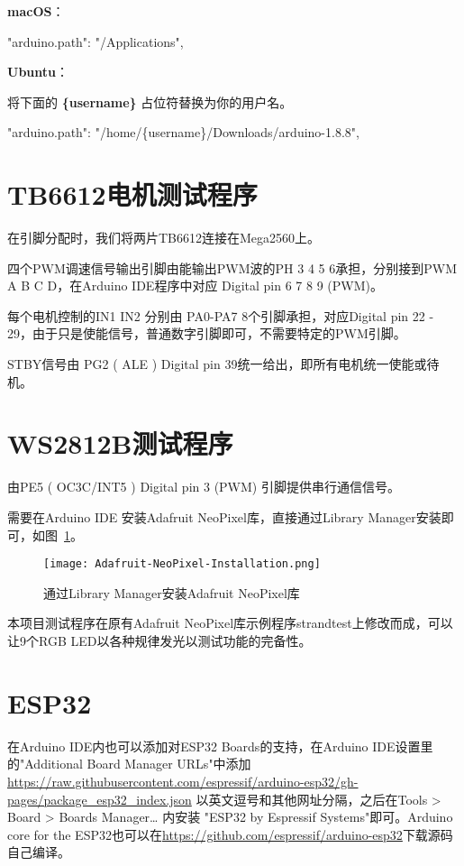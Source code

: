 \begin{enumerate}
        \textbf{macOS}：
    
        \begin{tcolorbox}    
            "arduino.path": "/Applications",
        \end{tcolorbox}

        \textbf{Ubuntu}：
    
        将下面的 \textbf{\{username\}} 占位符替换为你的用户名。
        \begin{tcolorbox}
            "arduino.path": "/home/\{username\}/Downloads/arduino-1.8.8",
        \end{tcolorbox}
    \end{enumerate}



\section{TB6612电机测试程序}

在引脚分配时，我们将两片TB6612连接在Mega2560上。

四个PWM调速信号输出引脚由能输出PWM波的PH 3 4 5 6承担，分别接到PWM A B C D，在Arduino IDE程序中对应 Digital pin 6 7 8 9 (PWM)。

每个电机控制的IN1 IN2 分别由 PA0-PA7 8个引脚承担，对应Digital pin 22 - 29，由于只是使能信号，普通数字引脚即可，不需要特定的PWM引脚。

STBY信号由 PG2 ( ALE ) Digital pin 39统一给出，即所有电机统一使能或待机。

\section{WS2812B测试程序}

由PE5 ( OC3C/INT5 ) Digital pin 3 (PWM) 引脚提供串行通信信号。

需要在Arduino IDE 安装Adafruit NeoPixel库，直接通过Library Manager安装即可，如图~\ref{fig:Adafruit-NeoPixel-Installation}。

\begin{figure}[htbp]
    \centering
    \texttt{[image: Adafruit-NeoPixel-Installation.png]}
    \caption{通过Library Manager安装Adafruit NeoPixel库}
    \label{fig:Adafruit-NeoPixel-Installation}
\end{figure}

本项目测试程序在原有Adafruit NeoPixel库示例程序strandtest上修改而成，可以让9个RGB LED以各种规律发光以测试功能的完备性。


\section{ESP32}

在Arduino IDE内也可以添加对ESP32 Boards的支持，在Arduino IDE设置里的"Additional Board Manager URLs"中添加\url{https://raw.githubusercontent.com/espressif/arduino-esp32/gh-pages/package_esp32_index.json} 以英文逗号和其他网址分隔，之后在Tools > Board > Boards Manager… 内安装 "ESP32 by Espressif Systems"即可。Arduino core for the ESP32也可以在\url{https://github.com/espressif/arduino-esp32}下载源码自己编译。